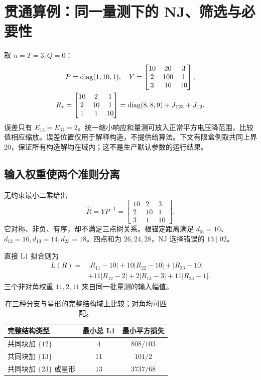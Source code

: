 \section{贯通算例：同一量测下的 NJ、筛选与必要性}
\label{sec:example}
取 $n=T=3,Q=0$：
\begin{equation}
 \begin{gathered}
 P=\operatorname{diag}(1,10,1),\quad
 Y=\begin{bmatrix}10&20&3\\2&100&1\\3&10&10\end{bmatrix},\\
 R_\star=\begin{bmatrix}10&2&1\\2&10&1\\1&1&10\end{bmatrix}
 =\operatorname{diag}(8,8,9)+J_{123}+J_{12}.
 \end{gathered}
 \label{eq:example}
\end{equation}
误差只有 $E_{13}=E_{31}=2$。统一缩小响应和量测可放入正常平方电压降范围，比较值相应缩放。误差位置仅用于解释构造，不提供给算法。下文有限盒例取共同上界 20，保证所有构造解均在域内；这不是生产默认参数的运行结果。

\subsection{输入权重使两个准则分离}
无约束最小二乘给出
\[
 \widehat R=YP^{-1}=\begin{bmatrix}10&2&3\\2&10&1\\3&1&10\end{bmatrix}.
\]
它对称、非负、有序，却不满足三点树关系。根锚定距离满足 $d_{0i}=10$、$d_{12}=16,d_{13}=14,d_{23}=18$。四点和为 $26,24,28$，NJ 选择错误的 $13\mid02$。

直接 L1 拟合则为
\begin{equation}
 \begin{aligned}
 L(R)={}&|R_{11}-10|+10|R_{22}-10|+|R_{33}-10|\\
 &+11|R_{12}-2|+2|R_{13}-3|+11|R_{23}-1|.
 \end{aligned}
 \label{eq:exampleloss}
\end{equation}
三个非对角权重 $11,2,11$ 来自同一批量测的输入幅值。

\begin{table}[htbp]
\centering
\begin{tabular}{lcc}
\toprule
完整结构类型 & 最小总 L1 & 最小平方损失\\
\midrule
共同块加 $\{12\}$ & $4$ & $808/103$\\
共同块加 $\{13\}$ & $11$ & $101/2$\\
共同块加 $\{23\}$ 或星形 & $13$ & $3737/68$\\
\bottomrule
\end{tabular}
\caption{在三种分支与星形的完整结构域上比较；对角均可匹配。}
\label{tab:examplecost}
\end{table}


